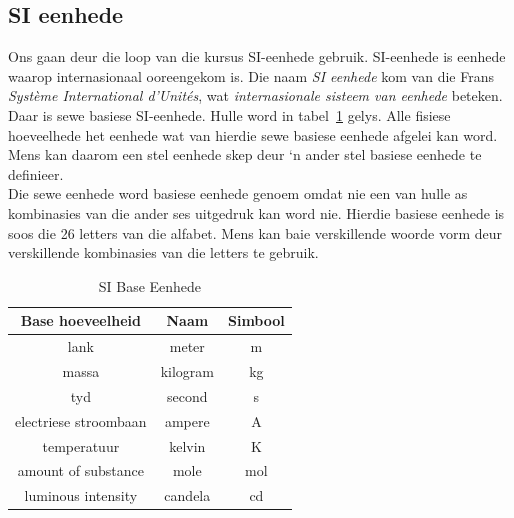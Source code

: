 \subsection*{SI eenhede}
            \nopagebreak
Ons gaan deur die loop van die kursus SI-eenhede gebruik. SI-eenhede is eenhede waarop internasionaal ooreengekom is.
  {Die naam \textsl{SI eenhede} kom van die Frans \textsl{Syst\`{e}me International d'Unit\'{e}s}, wat \textsl{internasionale sisteem van eenhede} beteken.  } 
Daar is sewe basiese SI-eenhede. Hulle word in tabel~\ref{tab:units:SIunits} gelys. Alle fisiese hoeveelhede het eenhede wat van hierdie sewe basiese eenhede afgelei kan word. Mens kan daarom een stel eenhede skep deur ‘n ander stel basiese eenhede te definieer. \\
Die sewe eenhede word basiese eenhede genoem omdat nie een van hulle as kombinasies van die ander ses uitgedruk kan word nie. Hierdie basiese eenhede is soos die 26 letters van die alfabet. Mens kan baie verskillende woorde vorm deur verskillende kombinasies van die letters te gebruik.\par 
\begin{table}[H]
\centering
\begin{tabular}{|c|c|c|}\hline
\textbf{Base hoeveelheid} & \textbf{Naam} & \textbf{Simbool} \\
\hline lank & meter & m\\ \hline 
massa & kilogram & kg\\ \hline 
tyd & second & s\\ \hline 
electriese stroombaan & ampere& A\\ \hline 
temperatuur & kelvin & K\\ \hline 
amount of substance & mole & mol\\ \hline 
luminous intensity & candela & cd\\ \hline
\end{tabular}
\caption{SI Base Eenhede}\label{tab:units:SIunits}
\end{table}
